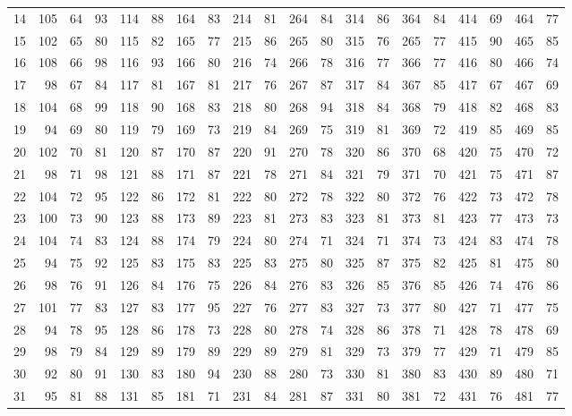 \begin{tabular}{@{}rr|rr|rr|rr|rr|rr|rr|rr|rr|rr@{}}
14 & 105 & 64 & 93 & 114 & 88 & 164 & 83 & 214 & 81 & 264 & 84 & 314 & 86 & 364 & 84 & 414 & 69 & 464 & 77 \\
15 & 102 & 65 & 80 & 115 & 82 & 165 & 77 & 215 & 86 & 265 & 80 & 315 & 76 & 265 & 77 & 415 & 90 & 465 & 85 \\
16 & 108 & 66 & 98 & 116 & 93 & 166 & 80 & 216 & 74 & 266 & 78 & 316 & 77 & 366 & 77 & 416 & 80 & 466 & 74 \\
17 & 98 & 67 & 84 & 117 & 81 & 167 & 81 & 217 & 76 & 267 & 87 & 317 & 84 & 367 & 85 & 417 & 67 & 467 & 69 \\
18 & 104 & 68 & 99 & 118 & 90 & 168 & 83 & 218 & 80 & 268 & 94 & 318 & 84 & 368 & 79 & 418 & 82 & 468 & 83 \\
19 & 94 & 69 & 80 & 119 & 79 & 169 & 73 & 219 & 84 & 269 & 75 & 319 & 81 & 369 & 72 & 419 & 85 & 469 & 85 \\
20 & 102 & 70 & 81 & 120 & 87 & 170 & 87 & 220 & 91 & 270 & 78 & 320 & 86 & 370 & 68 & 420 & 75 & 470 & 72 \\[1pt]
21 & 98 & 71 & 98 & 121 & 88 & 171 & 87 & 221 & 78 & 271 & 84 & 321 & 79 & 371 & 70 & 421 & 75 & 471 & 87 \\
22 & 104 & 72 & 95 & 122 & 86 & 172 & 81 & 222 & 80 & 272 & 78 & 322 & 80 & 372 & 76 & 422 & 73 & 472 & 78 \\
23 & 100 & 73 & 90 & 123 & 88 & 173 & 89 & 223 & 81 & 273 & 83 & 323 & 81 & 373 & 81 & 423 & 77 & 473 & 73 \\
24 & 104 & 74 & 83 & 124 & 88 & 174 & 79 & 224 & 80 & 274 & 71 & 324 & 71 & 374 & 73 & 424 & 83 & 474 & 78 \\
25 & 94 & 75 & 92 & 125 & 83 & 175 & 83 & 225 & 83 & 275 & 80 & 325 & 87 & 375 & 82 & 425 & 81 & 475 & 80 \\
26 & 98 & 76 & 91 & 126 & 84 & 176 & 75 & 226 & 84 & 276 & 83 & 326 & 85 & 376 & 85 & 426 & 74 & 476 & 86 \\
27 & 101 & 77 & 83 & 127 & 83 & 177 & 95 & 227 & 76 & 277 & 83 & 327 & 73 & 377 & 80 & 427 & 71 & 477 & 75 \\
28 & 94 & 78 & 95 & 128 & 86 & 178 & 73 & 228 & 80 & 278 & 74 & 328 & 86 & 378 & 71 & 428 & 78 & 478 & 69 \\
29 & 98 & 79 & 84 & 129 & 89 & 179 & 89 & 229 & 89 & 279 & 81 & 329 & 73 & 379 & 77 & 429 & 71 & 479 & 85 \\
30 & 92 & 80 & 91 & 130 & 83 & 180 & 94 & 230 & 88 & 280 & 73 & 330 & 81 & 380 & 83 & 430 & 89 & 480 & 71 \\[1pt]
31 & 95 & 81 & 88 & 131 & 85 & 181 & 71 & 231 & 84 & 281 & 87 & 331 & 80 & 381 & 72 & 431 & 76 & 481 & 77 \\

\end{tabular}
